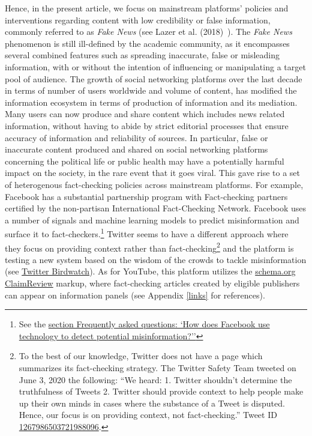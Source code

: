 \documentclass{article}
\begin{document}
Hence, in the present article, we focus on mainstream platforms' policies and interventions regarding content with low credibility or false information, commonly referred to as {\it Fake News} (see Lazer et al. (2018)~\cite{lazer}). The {\it Fake News} phenomenon is still ill-defined by the academic community, as it encompasses several combined features such as spreading inaccurate, false or misleading information, with or without the intention of influencing or manipulating a target pool of audience.  The growth of social networking platforms over the last decade in terms of number of users worldwide and volume of content, has modified the information ecosystem in terms of production of information and its mediation. Many users can now produce and share content which includes news related information, without having to abide by strict editorial processes that ensure accuracy of information and reliability of sources. In particular, false or inaccurate content produced and shared on social networking platforms concerning the political life or public health may have a potentially harmful impact on the society, in the rare event that it goes viral. This gave rise to a set of heterogenous fact-checking policies across mainstream platforms. For example, Facebook has a substantial partnership program with Fact-checking partners certified by the non-partisan International Fact-Checking Network. Facebook uses a number of signals and machine learning models to predict misinformation and surface it to fact-checkers.\footnote{See the \href{https://www.facebook.com/journalismproject/programs/third-party-fact-checking/how-it-works}{section Frequently asked questions: `How does Facebook use technology to detect potential misinformation?''}} Twitter seems to have a different approach where they focus on providing context rather than fact-checking\footnote{To the best of our knowledge, Twitter does not have a page which summarizes its fact-checking strategy. The Twitter Safety Team tweeted on June 3, 2020 the following:  ``We heard: 1. Twitter shouldn’t determine the truthfulness of Tweets 2. Twitter should provide context to help people make up their own minds in cases where the substance of a Tweet is disputed. Hence, our focus is on providing context, not fact-checking.'' Tweet ID \href{https://twitter.com/TwitterSafety/status/1267986503721988096}{1267986503721988096}.} and the platform is testing a new system based on the wisdom of the crowds to tackle misinformation (see \href{https://blog.twitter.com/en\_us/topics/product/2021/introducing-birdwatch-a-community-based-approach-to-misinformation}{Twitter Birdwatch}). As for YouTube, this platform utilizes the \href{https://schema.org/ClaimReview}{schema.org ClaimReview} markup, where fact-checking articles created by eligible publishers can appear on information panels (see Appendix \ref{links} for references).
\end{document}
